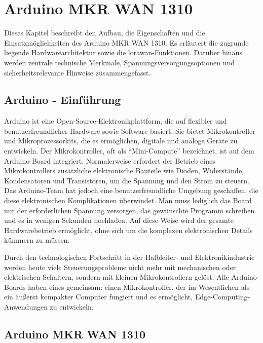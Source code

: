 %
%
%


\chapter{Arduino MKR WAN 1310}

Dieses Kapitel beschreibt den Aufbau, die Eigenschaften und die Einsatzmöglichkeiten des Arduino MKR WAN 1310. Es erläutert die zugrunde liegende Hardwarearchitektur sowie die \acs{lorawan}-Funktionen. Darüber hinaus werden zentrale technische Merkmale, Spannungsversorgungsoptionen und sicherheitsrelevante Hinweise zusammengefasst.
	
\section{Arduino - Einführung}

Arduino ist eine Open-Source-Elektronikplattform, die auf flexibler und benutzerfreundlicher Hardware sowie Software basiert. Sie bietet Mikrokontroller- und Mikroprozessorkits, die es ermöglichen, digitale und analoge Geräte zu entwickeln. Der Mikrokontroller, oft als ``Mini-Compute'' bezeichnet, ist auf dem Arduino-Board integriert. Normalerweise erfordert der Betrieb eines Mikrokontrollers zusätzliche elektronische Bauteile wie Dioden, Widerstände, Kondensatoren und Transistoren, um die Spannung und den Strom zu steuern. Das Arduino-Team hat jedoch eine benutzerfreundliche Umgebung geschaffen, die diese elektronischen Komplikationen überwindet. Man muss lediglich das Board mit der erforderlichen Spannung versorgen, das gewünschte Programm schreiben und es in wenigen Sekunden hochladen. Auf diese Weise wird der gesamte Hardwarebetrieb ermöglicht, ohne sich um die komplexen elektronischen Details kümmern zu müssen.

Durch den technologischen Fortschritt in der Halbleiter- und Elektronikindustrie werden heute viele Steuerungsprobleme nicht mehr mit mechanischen oder elektrischen Schaltern, sondern mit kleinen Mikrokontrollern gelöst. Alle Arduino-Boards haben eines gemeinsam: einen Mikrokontroller, der im Wesentlichen als ein äußerst kompakter Computer fungiert und es ermöglicht, Edge-Computing-Anwendungen zu entwickeln. \cite{Arduino:2021b}

\section{Arduino MKR WAN 1310}


